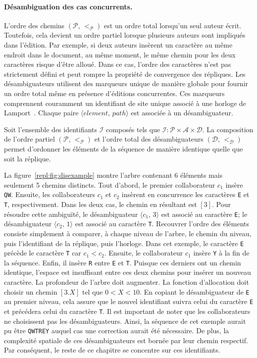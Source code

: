 \paragraph{Désambiguation des cas concurrents.}

L'ordre des chemins $(\mathcal{P},\, <_\mathcal{P})$ est un ordre total
lorsqu'un seul auteur écrit. Toutefois, cela devient un ordre partiel lorsque
plusieurs auteurs sont impliqués dans l'édition. Par exemple, si deux auteurs
insèrent un caractère au même endroit dans le document, au même moment, le même
chemin pour les deux caractères risque d'être alloué. Dans ce cas, l'ordre des
caractères n'est pas strictement défini et peut rompre la propriété de
convergence des répliques. Les désambiguateurs utilisent des marqueurs unique de
manière globale pour fournir un ordre total même en présence d'éditions
concurrentes. Ces marqueurs comprennent couramment un identifiant de site unique
associé à une horloge de Lamport~\cite{lamport1978time}. Chaque paire
$\langle element,\, path\rangle$ est associée à un désambiguateur.

Soit l'ensemble des identifiants $\mathcal{I}$ composés tels que
$\mathcal{I} : \mathcal{P} \times \mathcal{A} \times \mathcal{D}$. La
composition de l'ordre partiel $(\mathcal{P},\,<_\mathcal{P})$ et l'ordre total
des désambiguateurs $(\mathcal{D},\, <_\mathcal{D})$ permet d'ordonner les
éléments de la séquence de manière identique quelle que soit la réplique.

La figure~\ref{repl:fig:disexample} montre l'arbre contenant 6 éléments mais
seulement 5 chemins distincts. Tout d'abord, le premier collaborateur $c_1$
insère \texttt{QW}. Ensuite, les collaborateurs $c_1$ et $c_2$ insèrent en
concurrence les caractères \texttt{E} et \texttt{T}, respectivement. Dans les
deux cas, le chemin en résultant est $[3]$. Pour résoudre cette ambiguïté, le
désambiguateur $\langle c_1,\, 3 \rangle$ est associé au caractère \texttt{E};
le désambiguateur $\langle c_2,\, 1 \rangle$ est associé au caractère
\texttt{T}. Recouvrer l'ordre des éléments consiste simplement à comparer, à
chaque niveau de l'arbre, le chemin du niveau, puis l'identifiant de la
réplique, puis l'horloge. Dans cet exemple, le caractère \texttt{E} précède le
caractère \texttt{T} car $c_1< c_2$. Ensuite, le collaborateur $c_1$ insère
\texttt{Y} à la fin de la séquence. Enfin, il insère \texttt{R} entre \texttt{E}
et \texttt{T}. Puisque ces derniers ont un chemin identique, l'espace est
insuffisant entre ces deux chemins pour insérer un nouveau caractère. La
profondeur de l'arbre doit augmenter. La fonction d'allocation doit choisir un
chemin $[3.X]$ tel que $0<X<10$. En copiant le désambiguateur de \texttt{E} au
premier niveau, cela assure que le nouvel identifiant suivra celui du caractère
\texttt{E} et précédera celui du caractère \texttt{T}. Il est important de noter
que les collaborateurs ne choisissent pas les désambiguateurs. Ainsi, la
séquence de cet exemple aurait pu être \texttt{QWTREY} auquel cas une correction
aurait été nécessaire. De plus, la complexité spatiale de ces désambiguateurs
est bornée par leur chemin respectif. Par conséquent, le reste de ce chapitre se
concentre sur ces identifiants.

